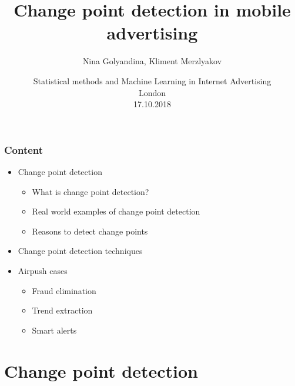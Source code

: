 \documentclass[intlimits, 9pt, unicode]{beamer}
\title{Change point detection in mobile advertising}
\author{Nina Golyandina, Kliment Merzlyakov}
\institute{Saint Petersburg State University \\
     Statistical modeling department \\
}
\date{
    Statistical methods and Machine Learning in Internet Advertising\\
    London\\
    17.10.2018
}
\begin{document}
\begin{frame}
    \titlepage
\end{frame}

\begin{frame}
    \frametitle{Content}

    \begin{itemize}
    	\item Change point detection
		     	 \begin{itemize}
	    		   \item What is change point detection?
		    	   \item Real world examples of change point detection 
		    	   \item Reasons to detect change points
		    	  \end{itemize}
        \item Change point detection techniques
        \item Airpush cases
		     	 \begin{itemize}
	    		   \item Fraud elimination
		    	   \item Trend extraction
		    	   \item Smart alerts
		    	  \end{itemize}
    \end{itemize}
\end{frame}

\section{Change point detection}
\end{document}
